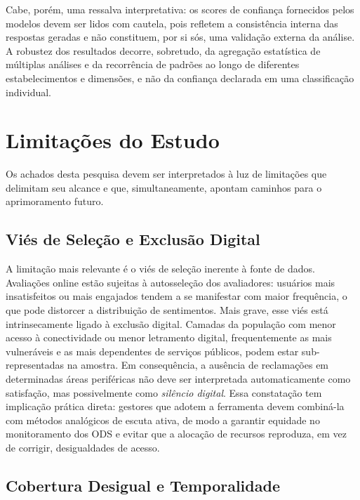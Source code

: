 Cabe, porém, uma ressalva interpretativa: os scores de confiança fornecidos pelos modelos devem ser lidos com cautela, pois refletem a consistência interna das respostas geradas e não constituem, por si sós, uma validação externa da análise. A robustez dos resultados decorre, sobretudo, da agregação estatística de múltiplas análises e da recorrência de padrões ao longo de diferentes estabelecimentos e dimensões, e não da confiança declarada em uma classificação individual.

\section{Limitações do Estudo}
\label{sec:disc-limitacoes}

Os achados desta pesquisa devem ser interpretados à luz de limitações que delimitam seu alcance e que, simultaneamente, apontam caminhos para o aprimoramento futuro.

\subsection{Viés de Seleção e Exclusão Digital}
\label{subsec:disc-vies-selecao}

A limitação mais relevante é o viés de seleção inerente à fonte de dados. Avaliações online estão sujeitas à autosseleção dos avaliadores: usuários mais insatisfeitos ou mais engajados tendem a se manifestar com maior frequência, o que pode distorcer a distribuição de sentimentos. Mais grave, esse viés está intrinsecamente ligado à exclusão digital. Camadas da população com menor acesso à conectividade ou menor letramento digital, frequentemente as mais vulneráveis e as mais dependentes de serviços públicos, podem estar sub-representadas na amostra. Em consequência, a ausência de reclamações em determinadas áreas periféricas não deve ser interpretada automaticamente como satisfação, mas possivelmente como \textit{silêncio digital}. Essa constatação tem implicação prática direta: gestores que adotem a ferramenta devem combiná-la com métodos analógicos de escuta ativa, de modo a garantir equidade no monitoramento dos ODS e evitar que a alocação de recursos reproduza, em vez de corrigir, desigualdades de acesso.

\subsection{Cobertura Desigual e Temporalidade}
\label{subsec:disc-cobertura-temporalidade}

